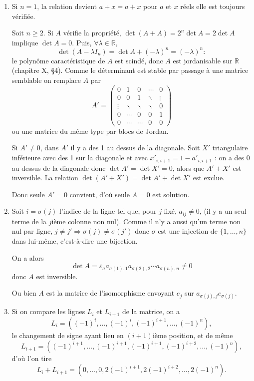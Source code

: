 \begin{enumerate}[label=\arabic*.,leftmargin=2.2em,itemsep=1.2em]
\item Si $n=1$, la relation devient $a+x=a+x$ pour $a$ et $x$ réels elle est toujours vérifiée.

Soit $n\ge2$. Si $A$ vérifie la propriété, $\det(A+A)=2^n\det A=2\det A$ implique $\det A=0$. Puis, $\forall\lambda\in\mathbb R$,
\[
\det(A-\lambda I_n)=\det A+(-\lambda)^n=(-\lambda)^n :
\]
le polynôme caractéristique de $A$ est scindé, donc $A$ est jordanisable sur $\mathbb R$ (chapitre X, §4). Comme le déterminant est stable par passage à une matrice semblable on remplace $A$ par
\[
A'=\begin{pmatrix}
0&1&0&\cdots&0\\
0&0&1&\ddots&\vdots\\
\vdots&\ddots&\ddots&\ddots&0\\
0&\cdots&0&0&1\\
0&\cdots&\cdots&0&0
\end{pmatrix}
\]
ou une matrice du même type par blocs de Jordan.

Si $A'\ne0$, dans $A'$ il y a des 1 au dessus de la diagonale. Soit $X'$ triangulaire inférieure avec des 1 sur la diagonale et avec $x'_{i,i+1}=1-a'_{i,i+1}$ : on a des 0 au dessus de la diagonale donc $\det A'=\det X'=0$, alors que $A'+X'$ est inversible. La relation $\det(A'+X')=\det A'+\det X'$ est exclue.

Donc seule $A'=0$ convient, d'où seule $A=0$ est solution.

\item Soit $i=\sigma(j)$ l'indice de la ligne tel que, pour $j$ fixé, $a_{ij}\ne0$, (il y a un seul terme de la $j$ième colonne non nul). Comme il n'y a aussi qu'un terme non nul par ligne, $j\ne j'\Rightarrow\sigma(j)\ne\sigma(j')$ donc $\sigma$ est une injection de $\{1,\ldots,n\}$ dans lui-même, c'est-à-dire une bijection.

On a alors
\[
\det A=\varepsilon_\sigma a_{\sigma(1),1}a_{\sigma(2),2}\cdots a_{\sigma(n),n}\ne0
\]
donc $A$ est inversible.

Ou bien $A$ est la matrice de l'isomorphisme envoyant $e_j$ sur $a_{\sigma(j),j}e_{\sigma(j)}$.

\item Si on compare les lignes $L_i$ et $L_{i+1}$ de la matrice, on a
\[
L_i=((-1)^i,\ldots,(-1)^i,(-1)^{i+1},\ldots,(-1)^n),
\]
le changement de signe ayant lieu en $(i+1)$ième position, et de même
\[
L_{i+1}=((-1)^{i+1},\ldots,(-1)^{i+1},(-1)^{i+1},(-1)^{i+2},\ldots,(-1)^n),
\]
d'où l'on tire
\[
L_i+L_{i+1}=(0,\ldots,0,2(-1)^{i+1},2(-1)^{i+2},\ldots,2(-1)^n).
\]


\end{enumerate}
